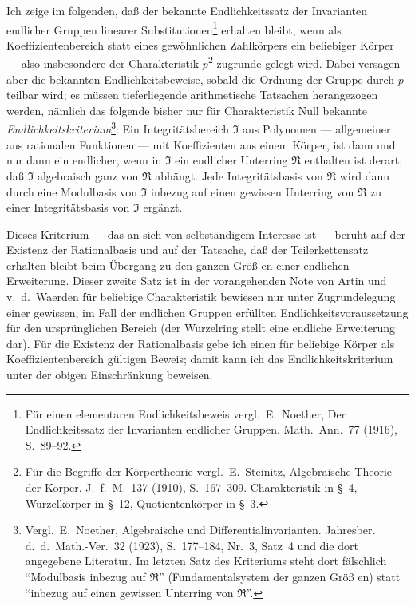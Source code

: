 \documentclass[12pt,a4paper]{article}
\begin{document}
{{\medskip
Ich zeige im folgenden, da{\ss} der bekannte Endlichkeitssatz der Invarianten
endlicher Gruppen linearer Substitutionen\footnote{F\"{u}r einen elementaren Endlichkeitsbeweis vergl.\ E.~Noether, Der Endlichkeitssatz
der Invarianten endlicher Gruppen. Math.\ Ann.\ 77 (1916), S.~89--92.} erhalten
bleibt, wenn als Koeffizientenbereich statt eines gew\"{o}hnlichen Zahlk\"{o}rpers
ein beliebiger K\"{o}rper --- also insbesondere der Charakteristik
$p$\footnote{F\"{u}r die Begriffe der K\"{o}rpertheorie vergl.\ E.~Steinitz, Algebraische
Theorie der K\"{o}rper. J.\ f.\ M.\ 137 (1910), S.~167--309. Charakteristik
in \S~4, Wurzelk\"{o}rper in \S~12, Quotientenk\"{o}rper in \S~3.} zugrunde gelegt wird.
Dabei versagen aber die bekannten Endlichkeitsbeweise, sobald die Ordnung
 der Gruppe durch $p$ teilbar wird; es m\"{u}ssen tieferliegende arithmetische
Tatsachen herangezogen werden, n\"{a}mlich das folgende bisher nur f\"{u}r Charakteristik
Null bekannte \textit{Endlichkeitskriterium}\footnote{Vergl.\ E.~Noether, Algebraische und Differentialinvarianten. Jahresber.
d.\ d.\ Math.-Ver.\ 32 (1923), S.~177--184, Nr.~3, Satz~4 und die dort angegebene
Literatur. Im letzten Satz des Kriteriums steht dort f\"{a}lschlich ``Modulbasis inbezug
auf $\mathfrak{R}$'' (Fundamentalsystem der ganzen Gr\"{o}{\ss} en) statt ``inbezug auf einen gewissen
Unterring von $\mathfrak{R}$''.}:
Ein Integrit\"{a}tsbereich $\mathfrak{I}$ aus Polynomen --- allgemeiner aus rationalen Funktionen
--- mit Koeffizienten aus einem K\"{o}rper, ist dann und nur dann ein endlicher,
wenn in $\mathfrak{I}$ ein endlicher Unterring $\mathfrak{R}$ enthalten ist derart, da{\ss} $\mathfrak{I}$ algebraisch
ganz von $\mathfrak{R}$ abh\"{a}ngt. Jede Integrit\"{a}tsbasis von $\mathfrak{R}$ wird dann durch eine
Modulbasis von $\mathfrak{I}$ inbezug auf einen gewissen Unterring von $\mathfrak{R}$ zu einer
Integrit\"{a}tsbasis von $\mathfrak{I}$ erg\"{a}nzt.

Dieses Kriterium --- das an sich von selbst\"{a}ndigem Interesse ist ---
beruht auf der Existenz der Rationalbasis und auf der Tatsache, da{\ss{}}
der Teilerkettensatz erhalten bleibt beim \"{U}bergang zu den ganzen Gr\"{o}{\ss} en
einer endlichen Erweiterung. Dieser zweite Satz ist in der vorangehenden
Note von Artin und v.~d.~Waerden f\"{u}r beliebige Charakteristik bewiesen
nur unter Zugrundelegung einer gewissen, im Fall der endlichen Gruppen
erf\"{u}llten Endlichkeitsvoraussetzung f\"{u}r den urspr\"{u}nglichen Bereich
(der Wurzelring stellt eine endliche Erweiterung dar). F\"{u}r die Existenz
der Rationalbasis gebe ich einen f\"{u}r beliebige K\"{o}rper als Koeffizientenbereich
g\"{u}ltigen Beweis; damit kann ich das Endlichkeitskriterium unter der
obigen Einschr\"{a}nkung beweisen.

}}
\end{document}
